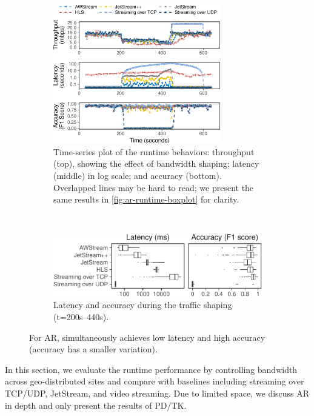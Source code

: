 \begin{figure}
  \begin{subfigure}[t]{\textwidth}
    \centering
    \includegraphics[width=0.8\textwidth]{figures/runtime_darknet-timeseries.pdf}
    \caption{Time-series plot of the runtime behaviors: throughput (top),
      showing the effect of bandwidth shaping; latency (middle) in log scale;
      and accuracy (bottom). Overlapped lines may be hard to read; we present
      the same results in \autoref{fig:ar-runtime-boxplot} for clarity.}
    \label{fig:ar-runtime-timeseries}
  \end{subfigure}
  \vspace{1em}
  \\
  \begin{subfigure}[t]{\textwidth}
    \centering
    \includegraphics[width=\textwidth]{figures/runtime_darknet-boxplot.pdf}
    \caption{Latency and accuracy during the traffic shaping (t=200s--440s).}
    \label{fig:ar-runtime-boxplot}
  \end{subfigure}
  \caption{For AR, \sysname{} simultaneously achieves low latency and high
    accuracy (accuracy has a smaller variation).}
  \label{fig:ar-runtime}
\end{figure}

In this section, we evaluate the runtime performance by controlling bandwidth
across geo-distributed sites and compare \sysname{} with baselines including
streaming over TCP/UDP, JetStream, and video streaming. Due to limited space, we
discuss AR in depth and only present the results of PD/TK.

